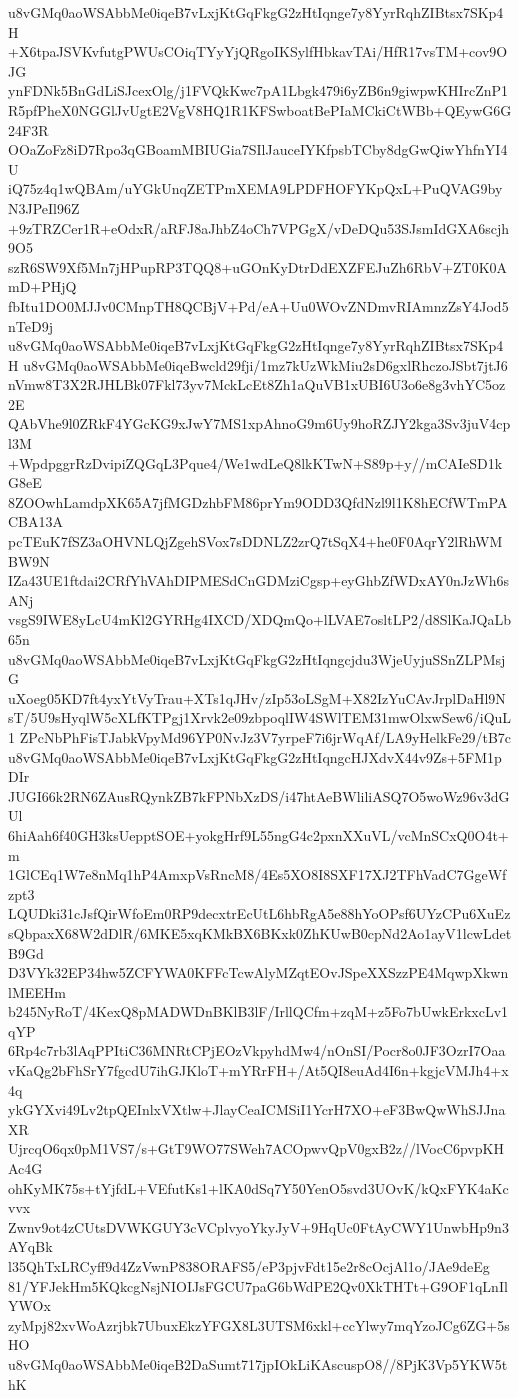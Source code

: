 u8vGMq0aoWSAbbMe0iqeB7vLxjKtGqFkgG2zHtIqnge7y8YyrRqhZIBtsx7SKp4H
+X6tpaJSVKvfutgPWUsCOiqTYyYjQRgoIKSylfHbkavTAi/HfR17vsTM+cov9OJG
ynFDNk5BnGdLiSJcexOlg/j1FVQkKwc7pA1Lbgk479i6yZB6n9giwpwKHIrcZnP1
R5pfPheX0NGGlJvUgtE2VgV8HQ1R1KFSwboatBePIaMCkiCtWBb+QEywG6G24F3R
OOaZoFz8iD7Rpo3qGBoamMBIUGia7SIlJauceIYKfpsbTCby8dgGwQiwYhfnYI4U
iQ75z4q1wQBAm/uYGkUnqZETPmXEMA9LPDFHOFYKpQxL+PuQVAG9byN3JPeIl96Z
+9zTRZCer1R+eOdxR/aRFJ8aJhbZ4oCh7VPGgX/vDeDQu53SJsmIdGXA6scjh9O5
szR6SW9Xf5Mn7jHPupRP3TQQ8+uGOnKyDtrDdEXZFEJuZh6RbV+ZT0K0AmD+PHjQ
fbItu1DO0MJJv0CMnpTH8QCBjV+Pd/eA+Uu0WOvZNDmvRIAmnzZsY4Jod5nTeD9j
u8vGMq0aoWSAbbMe0iqeB7vLxjKtGqFkgG2zHtIqnge7y8YyrRqhZIBtsx7SKp4H
u8vGMq0aoWSAbbMe0iqeBwcld29fji/1mz7kUzWkMiu2sD6gxlRhczoJSbt7jtJ6
nVmw8T3X2RJHLBk07Fkl73yv7MckLcEt8Zh1aQuVB1xUBI6U3o6e8g3vhYC5oz2E
QAbVhe9l0ZRkF4YGcKG9xJwY7MS1xpAhnoG9m6Uy9hoRZJY2kga3Sv3juV4cpl3M
+WpdpggrRzDvipiZQGqL3Pque4/We1wdLeQ8lkKTwN+S89p+y//mCAIeSD1kG8eE
8ZOOwhLamdpXK65A7jfMGDzhbFM86prYm9ODD3QfdNzl9l1K8hECfWTmPACBA13A
pcTEuK7fSZ3aOHVNLQjZgehSVox7sDDNLZ2zrQ7tSqX4+he0F0AqrY2lRhWMBW9N
IZa43UE1ftdai2CRfYhVAhDIPMESdCnGDMziCgsp+eyGhbZfWDxAY0nJzWh6sANj
vsgS9IWE8yLcU4mKl2GYRHg4IXCD/XDQmQo+lLVAE7osltLP2/d8SlKaJQaLb65n
u8vGMq0aoWSAbbMe0iqeB7vLxjKtGqFkgG2zHtIqngcjdu3WjeUyjuSSnZLPMsjG
uXoeg05KD7ft4yxYtVyTrau+XTs1qJHv/zIp53oLSgM+X82IzYuCAvJrplDaHl9N
sT/5U9sHyqlW5cXLfKTPgj1Xrvk2e09zbpoqlIW4SWlTEM31mwOlxwSew6/iQuL1
ZPcNbPhFisTJabkVpyMd96YP0NvJz3V7yrpeF7i6jrWqAf/LA9yHelkFe29/tB7c
u8vGMq0aoWSAbbMe0iqeB7vLxjKtGqFkgG2zHtIqngcHJXdvX44v9Zs+5FM1pDIr
JUGI66k2RN6ZAusRQynkZB7kFPNbXzDS/i47htAeBWliliASQ7O5woWz96v3dGUl
6hiAah6f40GH3ksUepptSOE+yokgHrf9L55ngG4c2pxnXXuVL/vcMnSCxQ0O4t+m
1GlCEq1W7e8nMq1hP4AmxpVsRncM8/4Es5XO8I8SXF17XJ2TFhVadC7GgeWfzpt3
LQUDki31cJsfQirWfoEm0RP9decxtrEcUtL6hbRgA5e88hYoOPsf6UYzCPu6XuEz
sQbpaxX68W2dDlR/6MKE5xqKMkBX6BKxk0ZhKUwB0cpNd2Ao1ayV1lcwLdetB9Gd
D3VYk32EP34hw5ZCFYWA0KFFcTcwAlyMZqtEOvJSpeXXSzzPE4MqwpXkwnlMEEHm
b245NyRoT/4KexQ8pMADWDnBKlB3lF/IrllQCfm+zqM+z5Fo7bUwkErkxcLv1qYP
6Rp4c7rb3lAqPPItiC36MNRtCPjEOzVkpyhdMw4/nOnSI/Pocr8o0JF3OzrI7Oaa
vKaQg2bFhSrY7fgcdU7ihGJKloT+mYRrFH+/At5QI8euAd4I6n+kgjcVMJh4+x4q
ykGYXvi49Lv2tpQEInlxVXtlw+JlayCeaICMSiI1YcrH7XO+eF3BwQwWhSJJnaXR
UjrcqO6qx0pM1VS7/s+GtT9WO77SWeh7ACOpwvQpV0gxB2z//lVocC6pvpKHAc4G
ohKyMK75s+tYjfdL+VEfutKs1+lKA0dSq7Y50YenO5svd3UOvK/kQxFYK4aKcvvx
Zwnv9ot4zCUtsDVWKGUY3cVCplvyoYkyJyV+9HqUc0FtAyCWY1UnwbHp9n3AYqBk
l35QhTxLRCyff9d4ZzVwnP838ORAFS5/eP3pjvFdt15e2r8cOcjAl1o/JAe9deEg
81/YFJekHm5KQkcgNsjNIOIJsFGCU7paG6bWdPE2Qv0XkTHTt+G9OF1qLnIlYWOx
zyMpj82xvWoAzrjbk7UbuxEkzYFGX8L3UTSM6xkl+ccYlwy7mqYzoJCg6ZG+5sHO
u8vGMq0aoWSAbbMe0iqeB2DaSumt717jpIOkLiKAscuspO8//8PjK3Vp5YKW5thK
